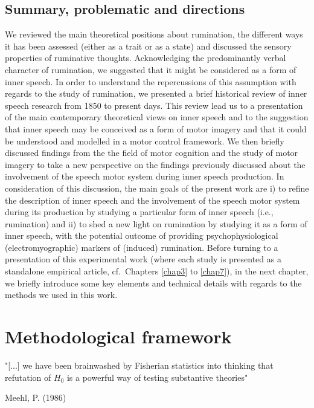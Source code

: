 \documentclass[a4paper,12pt,twoside,onecolumn,openright,final,oldfontcommands]{memoir}
\begin{document}
\hypertarget{summary-problematic-and-directions}{%
\section{Summary, problematic and directions}\label{summary-problematic-and-directions}}

We reviewed the main theoretical positions about rumination, the different ways it has been assessed (either as a trait or as a state) and discussed the sensory properties of ruminative thoughts. Acknowledging the predominantly verbal character of rumination, we suggested that it might be considered as a form of inner speech. In order to understand the repercussions of this assumption with regards to the study of rumination, we presented a brief historical review of inner speech research from 1850 to present days. This review lead us to a presentation of the main contemporary theoretical views on inner speech and to the suggestion that inner speech may be conceived as a form of motor imagery and that it could be understood and modelled in a motor control framework. We then briefly discussed findings from the the field of motor cognition and the study of motor imagery to take a new perspective on the findings previously discussed about the involvement of the speech motor system during inner speech production. In consideration of this discussion, the main goals of the present work are i) to refine the description of inner speech and the involvement of the speech motor system during its production by studying a particular form of inner speech (i.e., rumination) and ii) to shed a new light on rumination by studying it as a form of inner speech, with the potential outcome of providing psychophysiological (electromyographic) markers of (induced) rumination. Before turning to a presentation of this experimental work (where each study is presented as a standalone empirical article, cf.~Chapters \ref{chap3} to \ref{chap7}), in the next chapter, we briefly introduce some key elements and technical details with regards to the methods we used in this work.

\hypertarget{chap2}{%
\chapter{Methodological framework}\label{chap2}}

\epigraph{"[...] we have been brainwashed by Fisherian statistics into thinking that refutation of $H_{0}$ is a powerful way of testing substantive theories"}{Meehl, P. (1986)}
\end{document}
